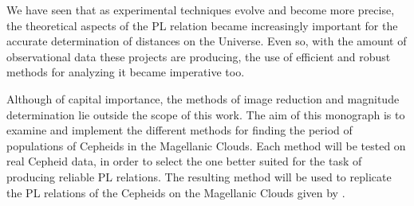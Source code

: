 We have seen that as experimental techniques evolve and become more precise, 
the theoretical aspects of the PL relation became increasingly important for the accurate determination of distances on the Universe.
Even so, with the amount of observational data these projects are producing, 
the use of efficient and robust methods for analyzing it became imperative too.

Although of capital importance, the methods of image reduction and magnitude determination lie outside the scope of this work.
The aim of this monograph is to examine and implement the different methods for finding the period of populations of Cepheids in the Magellanic Clouds.
Each method will be tested on real Cepheid data, in order to select the one better suited for the task of producing reliable PL relations.
The resulting method will be used to replicate the PL relations of the Cepheids on the Magellanic Clouds given by \cite{OGLE2016}.



